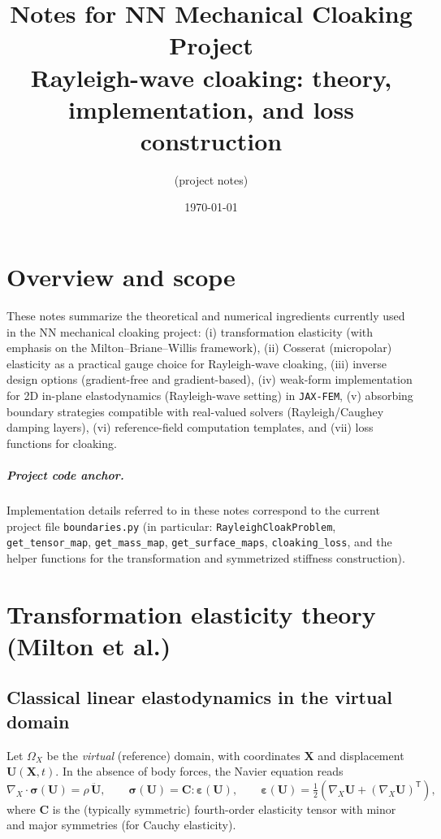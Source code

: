 \documentclass[11pt,a4paper]{report}
\title{Notes for NN Mechanical Cloaking Project\\
Rayleigh-wave cloaking: theory, implementation, and loss construction}
\author{(project notes)}
\date{\today}
\begin{document}
\maketitle
\tableofcontents

\chapter{Overview and scope}
These notes summarize the theoretical and numerical ingredients currently used in the NN mechanical cloaking project:
(i) transformation elasticity (with emphasis on the Milton--Briane--Willis framework),
(ii) Cosserat (micropolar) elasticity as a practical gauge choice for Rayleigh-wave cloaking,
(iii) inverse design options (gradient-free and gradient-based),
(iv) weak-form implementation for 2D in-plane elastodynamics (Rayleigh-wave setting) in \texttt{JAX-FEM},
(v) absorbing boundary strategies compatible with real-valued solvers (Rayleigh/Caughey damping layers),
(vi) reference-field computation templates, and
(vii) loss functions for cloaking.

\paragraph{Project code anchor.}
Implementation details referred to in these notes correspond to the current project file \texttt{boundaries.py}
(in particular: \texttt{RayleighCloakProblem}, \texttt{get\_tensor\_map}, \texttt{get\_mass\_map}, \texttt{get\_surface\_maps},
\texttt{cloaking\_loss}, and the helper functions for the transformation and symmetrized stiffness construction).

\chapter{Transformation elasticity theory (Milton et al.)}
\section{Classical linear elastodynamics in the virtual domain}
Let $\Omega_X$ be the \emph{virtual} (reference) domain, with coordinates $\bm X$ and displacement $\bm U(\bm X,t)$.
In the absence of body forces, the Navier equation reads
\begin{equation}
\nabla_X \cdot \bm\sigma(\bm U) = \rho\, \ddot{\bm U}, \qquad
\bm\sigma(\bm U) = \bm C : \bm\varepsilon(\bm U), \qquad
\bm\varepsilon(\bm U) = \tfrac12(\nabla_X \bm U + (\nabla_X \bm U)^{\mathsf T}),
\end{equation}
where $\bm C$ is the (typically symmetric) fourth-order elasticity tensor with minor and major symmetries (for Cauchy elasticity).
\end{document}
